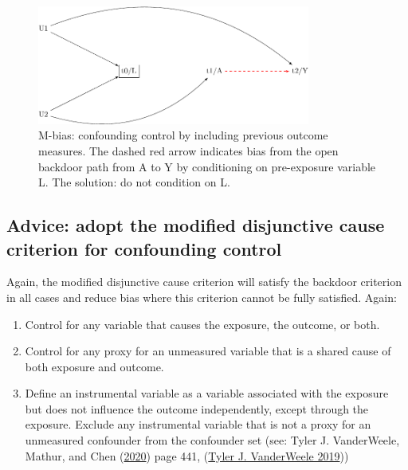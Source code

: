 \documentclass[
  singlecolumn]{report}
\providecommand{\tightlist}{%
  \setlength{\itemsep}{0pt}\setlength{\parskip}{0pt}}\usepackage{longtable,booktabs,array}
\begin{document}
\begin{figure}

{\centering \includegraphics[width=0.8\textwidth,height=\textheight]{causal-dags_files/figure-pdf/fig-m-bias-1.pdf}

}

\caption{\label{fig-m-bias}M-bias: confounding control by including
previous outcome measures. The dashed red arrow indicates bias from the
open backdoor path from A to Y by conditioning on pre-exposure variable
L. The solution: do not condition on L.}

\end{figure}

\hypertarget{advice-adopt-the-modified-disjunctive-cause-criterion-for-confounding-control}{%
\subsection{Advice: adopt the modified disjunctive cause criterion for
confounding
control}\label{advice-adopt-the-modified-disjunctive-cause-criterion-for-confounding-control}}

Again, the modified disjunctive cause criterion will satisfy the
backdoor criterion in all cases and reduce bias where this criterion
cannot be fully satisfied. Again:

\begin{enumerate}
\def\labelenumi{\alph{enumi}.}
\tightlist
\item
  Control for any variable that causes the exposure, the outcome, or
  both.
\item
  Control for any proxy for an unmeasured variable that is a shared
  cause of both exposure and outcome.
\item
  Define an instrumental variable as a variable associated with the
  exposure but does not influence the outcome independently, except
  through the exposure. Exclude any instrumental variable that is not a
  proxy for an unmeasured confounder from the confounder set (see: Tyler
  J. VanderWeele, Mathur, and Chen
  (\protect\hyperlink{ref-vanderweele2020}{2020}) page 441,
  (\protect\hyperlink{ref-vanderweele2019}{Tyler J. VanderWeele 2019}))
\end{enumerate}
\end{document}
